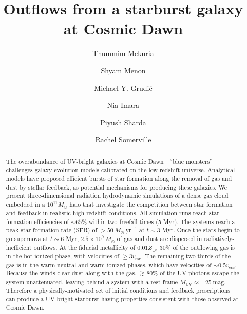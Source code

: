 \documentclass[twocolumn,linenumbers]{aastex631}
\begin{document}
\author{Thummim Mekuria}

\author{Shyam Menon}
\author{Michael Y. Grudi\'{c}}
\author{Nia Imara}

\author{Piyush Sharda}

\author{Rachel Somerville} 

\title{Outflows from a starburst galaxy at Cosmic Dawn}
\begin{abstract}
The overabundance of UV-bright galaxies at Cosmic Dawn---``blue monsters'' --- challenges galaxy evolution models calibrated on the low-redshift universe. Analytical models have proposed efficient bursts of star formation along the removal of gas and dust by stellar feedback, as potential mechanisms for producing these galaxies. We present three-dimensional radiation hydrodynamic simulations of a dense gas cloud embedded in a $10^{11} M_\odot$ halo that investigate the competition between star formation and feedback in realistic high-redshift conditions. All simulation runs reach star formation efficiencies of $\sim 65\%$ within two freefall times (5 Myr). The systems reach a peak star formation rate (SFR) of $ > 50\ M_\odot\ \mathrm{yr^{-1}}$ at $t\sim 3$ Myr. Once the stars begin to go supernova at $t\sim 6$ Myr, $2.5\times 10^9\ M_\odot$ of gas and dust are dispersed in radiatively-inefficient outflows. At the fiducial metallicity of $0.01 Z_\odot$, $30 \%$ of the outflowing gas is in the hot ionized phase, with velocities of $\geq 3v_\mathrm{esc}$. The remaining two-thirds of the gas is in the warm neutral and warm ionized phases, which have velocities of $\sim 0.5v_\mathrm{esc}$. Because the winds clear dust along with the gas, $\gtrsim 80\%$ of the UV photons escape the system unattenuated, leaving behind a system with a rest-frame $M_\mathrm{UV} \approx -25\ \mathrm{mag}$. Therefore a physically-motivated set of initial conditions and feedback prescriptions can produce a UV-bright starburst having properties consistent with those observed at Cosmic Dawn.
\end{abstract}
\end{document}
